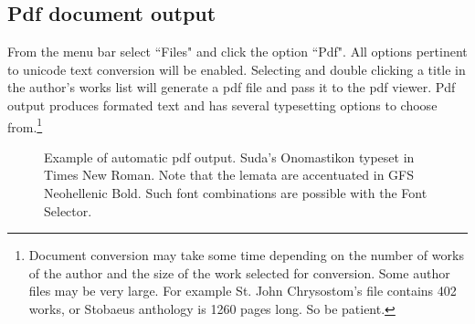 \documentclass[11pt,a4paper]{article}
\begin{document}
  \subsection{Pdf document output}From the menu bar select ``Files" and click the
    option ``Pdf". All options pertinent to unicode text conversion will be
    enabled. Selecting and double clicking a title in the author's works
    list will generate a pdf file and pass it to the pdf viewer.  Pdf output
    produces formated text and has several typesetting options to
    choose from.\footnote{Document conversion may take some time depending
    on the number of works of the author and the size of the work selected
    for conversion.  Some author files may be very large.
    For example St. John Chrysostom's file contains 402 works, or Stobaeus anthology
    is 1260 pages long. So be patient.}
              \begin{figure}[htb]
                \begin{center}
                  \caption{Example of automatic pdf output.
                           Suda's Onomastikon typeset in Times New Roman.
                           Note that the lemata are accentuated
                           in GFS Neohellenic Bold.  Such font combinations
                           are possible with the Font Selector.
                           }
                \end{center}
              \end{figure}
\end{document}
